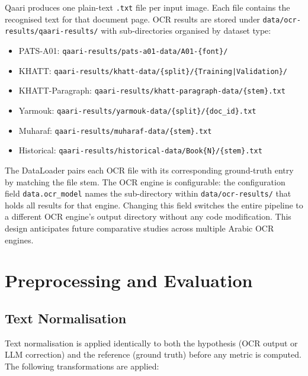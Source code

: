 Qaari produces one plain-text \texttt{.txt} file per input image.
Each file contains the recognised text for that document page.
OCR results are stored under \texttt{data/ocr-results/qaari-results/} with
sub-directories organised by dataset type:
\begin{itemize}
  \item PATS-A01:      \texttt{qaari-results/pats-a01-data/A01-\{font\}/}
  \item KHATT:         \texttt{qaari-results/khatt-data/\{split\}/\{Training|Validation\}/}
  \item KHATT-Paragraph: \texttt{qaari-results/khatt-paragraph-data/\{stem\}.txt}
  \item Yarmouk:       \texttt{qaari-results/yarmouk-data/\{split\}/\{doc\_id\}.txt}
  \item Muharaf:       \texttt{qaari-results/muharaf-data/\{stem\}.txt}
  \item Historical:    \texttt{qaari-results/historical-data/Book\{N\}/\{stem\}.txt}
\end{itemize}

\noindent
The DataLoader pairs each OCR file with its corresponding ground-truth entry by
matching the file stem.
The OCR engine is configurable: the configuration field \texttt{data.ocr\_model}
names the sub-directory within \texttt{data/ocr-results/} that holds all results
for that engine.
Changing this field switches the entire pipeline to a different OCR engine's output
directory without any code modification.
This design anticipates future comparative studies across multiple Arabic OCR engines.

\section{Preprocessing and Evaluation}
\label{sec:eval}

\subsection{Text Normalisation}
\label{subsec:norm}

Text normalisation is applied identically to both the hypothesis (OCR output or
LLM correction) and the reference (ground truth) before any metric is computed.
The following transformations are applied:

